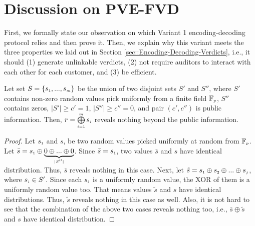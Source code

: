 

\vspace{-3mm}



\section{Discussion on PVE-FVD}\label{sec::Variant-1-Theorem-proof}
\vspace{-.6mm}

First, we formally state our observation on which  Variant 1 encoding-decoding protocol relies and then prove it. Then, we explain why this variant meets the three properties we laid out in Section \ref{sec::Encoding-Decoding-Verdicts}, i.e., it should (1) generate unlinkable verdicts, (2) not require auditors to interact with each other for each customer, and (3) be efficient.

\vspace{-3mm}

\begin{theorem}\label{set-xor}
Let set $S=\{s_{\scriptscriptstyle 1},..., s_{\scriptscriptstyle m}\}$ be the union of  two disjoint sets $S'$ and $S''$, where $S'$ contains non-zero random values pick uniformly  from a finite field $\mathbb{F}_{\scriptscriptstyle p}$, $S''$ contains zeros, $|S'|\geq c'=1$, $|S''|\geq c''=0$, and pair $(c',c'')$ is public information. Then, $r= \bigoplus\limits^{\scriptscriptstyle m}_{\scriptscriptstyle i=1} s_{\scriptscriptstyle i}$ reveals nothing beyond the public information.  
\end{theorem}

\vspace{-3mm}
\begin{proof}
Let $s_{\scriptscriptstyle 1}$ and $s$, be two random values picked uniformly at random from $\mathbb{F}_{\scriptscriptstyle p}$. Let $\bar s=s_{\scriptscriptstyle 1}\oplus \underbrace{0\oplus... \oplus 0}_{\scriptscriptstyle |S''|}$. Since  $\bar s=s_{\scriptscriptstyle 1}$, two values $\bar s$ and $s$ have identical distribution. Thus, $\bar s$ reveals nothing in this case. Next, let $\tilde s={ s_{\scriptscriptstyle 1}\oplus s_{\scriptscriptstyle 2}\oplus... \oplus s_{\scriptscriptstyle j}}$, where $s_{\scriptscriptstyle i}\in S'$. Since each $s_{\scriptscriptstyle i}$ is a uniformly random value,  the XOR of them is a uniformly random value too. That means values $\tilde s$ and $s$ have identical distributions. Thus, $\tilde s$ reveals nothing in this case as well. Also, it is not hard to see that the combination of the above two cases reveals nothing too, i.e., $\bar s\oplus \tilde s$ and $s$ have identical distribution. 
%
\end{proof}

